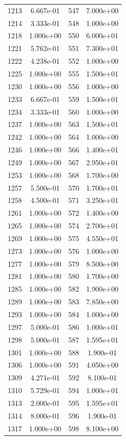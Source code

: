 \documentclass[12pt]{article}
\begin{document}
\begin{longtable}{@{}cccc@{}}
1213 & 6.667e-01 & 547 & 7.000e+00 \\
1214 & 3.333e-01 & 548 & 1.000e+00 \\
1218 & 1.000e+00 & 550 & 6.000e+01 \\
1221 & 5.762e-01 & 551 & 7.300e+01 \\
1222 & 4.238e-01 & 552 & 1.000e+00 \\
1225 & 1.000e+00 & 555 & 1.500e+01 \\
1230 & 1.000e+00 & 556 & 1.000e+00 \\
1233 & 6.667e-01 & 559 & 1.500e+01 \\
1234 & 3.333e-01 & 560 & 1.000e+00 \\
1237 & 1.000e+00 & 563 & 1.500e+01 \\
1242 & 1.000e+00 & 564 & 1.000e+00 \\
1246 & 1.000e+00 & 566 & 1.400e+01 \\
1249 & 1.000e+00 & 567 & 2.950e+01 \\
1253 & 1.000e+00 & 568 & 1.700e+00 \\
1257 & 5.500e-01 & 570 & 1.700e+01 \\
1258 & 4.500e-01 & 571 & 3.250e+01 \\
1261 & 1.000e+00 & 572 & 1.400e+00 \\
1265 & 1.000e+00 & 574 & 2.700e+01 \\
1269 & 1.000e+00 & 575 & 4.550e+01 \\
1273 & 1.000e+00 & 576 & 1.000e+00 \\
1277 & 1.000e+00 & 579 & 8.500e+00 \\
1281 & 1.000e+00 & 580 & 1.700e+00 \\
1285 & 1.000e+00 & 582 & 1.900e+00 \\
1289 & 1.000e+00 & 583 & 7.850e+00 \\
1293 & 1.000e+00 & 584 & 1.000e+00 \\
1297 & 5.000e-01 & 586 & 1.000e+01 \\
1298 & 5.000e-01 & 587 & 1.595e+01 \\
1301 & 1.000e+00 & 588 & 1.900e-01 \\
1306 & 1.000e+00 & 591 & 4.050e+00 \\
1309 & 4.271e-01 & 592 & 8.100e-01 \\
1310 & 5.729e-01 & 594 & 1.000e+01 \\
1313 & 2.000e-01 & 595 & 1.595e+01 \\
1314 & 8.000e-01 & 596 & 1.900e-01 \\
1317 & 1.000e+00 & 598 & 8.100e+00 \\

\end{longtable}
\end{document}
